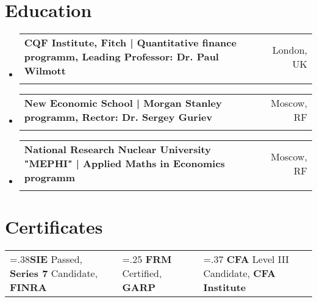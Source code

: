 \documentclass[letterpaper,hidelinks]{article}
\makeatletter
\newcommand{\resumeSubheading}[4]{
  \vspace{-2pt}\item
    \begin{tabular*}{0.97\textwidth}[t]{l@{\extracolsep{\fill}}r}
      \textbf{#1} & #2 \\
      \text{\small#3} & \text{\small #4} \\
    \end{tabular*}\vspace{-7pt}
}
\newcommand{\resumeSubHeadingListStart}{\begin{itemize}[leftmargin=0.1in, label={}]}
\newcommand{\resumeSubHeadingListEnd}{\end{itemize}}
\makeatother
\begin{document}
\vspace{-10pt}
\section{Education}
\vspace{1pt}
\resumeSubHeadingListStart
\resumeSubheading
{{CQF Institute, Fitch | Quantitative finance programm, Leading Professor: Dr. Paul Wilmott}}{London, UK\vspace{-2pt}}
{Quantitative Finance Charter}{Jan 2022 \textbf{--} Jul 2022\vspace{4pt}}
\resumeSubheading
{{New Economic School | Morgan Stanley programm, Rector: Dr. Sergey Guriev}}{Moscow, RF\vspace{-2pt}}
{Master in Finance}{Sep 2013 \textbf{--} Jul 2015\vspace{4pt}}
\resumeSubheading
{{National Research Nuclear University "MEPHI" | Applied Maths in Economics programm}}{Moscow, RF\vspace{-2pt}}
{Economist Mathematician}{Sep 2007 \textbf{--} Jul 2012}
\resumeSubHeadingListEnd

\vspace{-4pt}
\section{Certificates}
\resumeSubHeadingListStart
\small{\item{
  \begin{tabularx}{0.9\textwidth} { 
     >{\centering\arraybackslash\hsize=.38\hsize}X 
    || >{\centering\arraybackslash\hsize=.25\hsize}X 
    || >{\centering\arraybackslash\hsize=.37\hsize}X } 
    \textbf{SIE} Passed, \textbf{Series 7} Candidate, \textbf{FINRA} &
    \textbf{FRM} Certified, \textbf{GARP} & 
    \textbf{CFA} Level III Candidate, \textbf{CFA Institute} 
  \end{tabularx}
}}
\resumeSubHeadingListEnd
\end{document}
